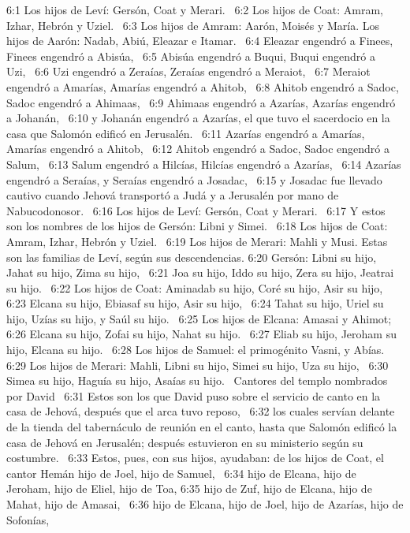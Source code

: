 6:1 Los hijos de Leví: Gersón, Coat y Merari.  
6:2 Los hijos de Coat: Amram, Izhar, Hebrón y Uziel.  
6:3 Los hijos de Amram: Aarón, Moisés y María. Los hijos de Aarón: Nadab, Abiú, Eleazar e Itamar.  
6:4 Eleazar engendró a Finees, Finees engendró a Abisúa,  
6:5 Abisúa engendró a Buqui, Buqui engendró a Uzi,  
6:6 Uzi engendró a Zeraías, Zeraías engendró a Meraiot,  
6:7 Meraiot engendró a Amarías, Amarías engendró a Ahitob,  
6:8 Ahitob engendró a Sadoc, Sadoc engendró a Ahimaas,  
6:9 Ahimaas engendró a Azarías, Azarías engendró a Johanán,  
6:10 y Johanán engendró a Azarías, el que tuvo el sacerdocio en la casa que Salomón edificó en Jerusalén.  
6:11 Azarías engendró a Amarías, Amarías engendró a Ahitob,  
6:12 Ahitob engendró a Sadoc, Sadoc engendró a Salum,  
6:13 Salum engendró a Hilcías, Hilcías engendró a Azarías,  
6:14 Azarías engendró a Seraías, y Seraías engendró a Josadac,  
6:15 y Josadac fue llevado cautivo cuando Jehová transportó a Judá y a Jerusalén por mano de Nabucodonosor.  
6:16 Los hijos de Leví: Gersón, Coat y Merari.  
6:17 Y estos son los nombres de los hijos de Gersón: Libni y Simei.  
6:18 Los hijos de Coat: Amram, Izhar, Hebrón y Uziel.  
6:19 Los hijos de Merari: Mahli y Musi. Estas son las familias de Leví, según sus descendencias. 
6:20 Gersón: Libni su hijo, Jahat su hijo, Zima su hijo,  
6:21 Joa su hijo, Iddo su hijo, Zera su hijo, Jeatrai su hijo.  
6:22 Los hijos de Coat: Aminadab su hijo, Coré su hijo, Asir su hijo,  
6:23 Elcana su hijo, Ebiasaf su hijo, Asir su hijo,  
6:24 Tahat su hijo, Uriel su hijo, Uzías su hijo, y Saúl su hijo.  
6:25 Los hijos de Elcana: Amasai y Ahimot;  
6:26 Elcana su hijo, Zofai su hijo, Nahat su hijo.  
6:27 Eliab su hijo, Jeroham su hijo, Elcana su hijo.  
6:28 Los hijos de Samuel: el primogénito Vasni, y Abías.  
6:29 Los hijos de Merari: Mahli, Libni su hijo, Simei su hijo, Uza su hijo,  
6:30 Simea su hijo, Haguía su hijo, Asaías su hijo.  
Cantores del templo nombrados por David  
6:31 Estos son los que David puso sobre el servicio de canto en la casa de Jehová, después que el arca tuvo reposo,  
6:32 los cuales servían delante de la tienda del tabernáculo de reunión en el canto, hasta que Salomón edificó la casa de Jehová en Jerusalén; después estuvieron en su ministerio según su costumbre.  
6:33 Estos, pues, con sus hijos, ayudaban: de los hijos de Coat, el cantor Hemán hijo de Joel, hijo de Samuel,  
6:34 hijo de Elcana, hijo de Jeroham, hijo de Eliel, hijo de Toa, 
6:35 hijo de Zuf, hijo de Elcana, hijo de Mahat, hijo de Amasai,  
6:36 hijo de Elcana, hijo de Joel, hijo de Azarías, hijo de Sofonías,  
